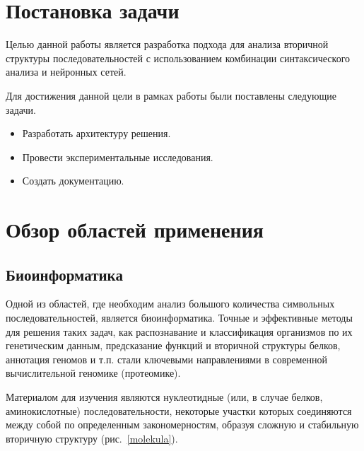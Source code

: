 \documentclass[14pt]{matmex-diploma-custom}
\begin{document}
\section{Постановка задачи}
Целью данной работы является разработка подхода для анализа вторичной структуры последовательностей с использованием комбинации синтаксического анализа и нейронных сетей.

Для достижения данной цели в рамках работы были поставлены следующие задачи.
\begin{itemize}
    \item Разработать архитектуру решения.
    \item Провести экспериментальные исследования.
    \item Создать документацию.
\end{itemize}

\section{Обзор областей применения}
\subsection{Биоинформатика}
Одной из областей, где необходим анализ большого количества символьных последовательностей, является биоинформатика. Точные и эффективные методы для решения таких задач, как распознавание и классификация организмов по их генетическим данным, предсказание функций и вторичной структуры белков, аннотация геномов и т.п. стали ключевыми направлениями в современной вычислительной геномике (протеомике). 

Материалом для изучения являются нуклеотидные (или, в случае белков, аминокислотные) последовательности, некоторые участки которых соединяются между собой по определенным закономерностям, образуя сложную и стабильную вторичную структуру (рис.~\ref{molekula}).
\end{document}
